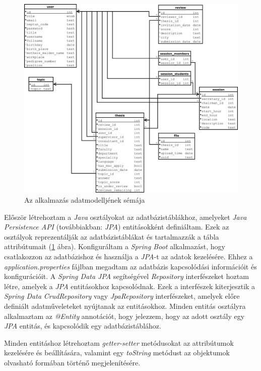 \begin{figure}[ht]
	\includegraphics[width=\textwidth]{images/Adatmodell.pdf}
	\caption{Az alkalmazás adatmodelljének sémája}
	\label{fig:datamodel}
\end{figure}


Először létrehoztam a \textit{Java} \cite{java} osztályokat az adatbázistáblákhoz, amelyeket \textit{Java Persistence API} (továbbiakban: \textit{JPA}) \cite{Java Persistence API} entitásokként definiáltam. Ezek az osztályok reprezentálják az adatbázistáblákat és tartalmazzák a tábla attribútumait (\ref{fig:datamodel} ábra). Konfiguráltam a \textit{Spring Boot} \cite{spring_boot} alkalmazást, hogy csatlakozzon az adatbázishoz és használja a \textit{JPA}-t \cite{Java Persistence API} az adatok kezelésére. Ehhez a \textit{application.properties} fájlban megadtam az adatbázis kapcsolódási információit és konfigurációit. A \textit{Spring Data JPA} \cite{Spring Data JPA} segítségével \textit{Repository} interfészeket hoztam létre, amelyek a \textit{JPA} entitásokhoz kapcsolódnak. Ezek a interfészek kiterjesztik a \textit{Spring Data} \textit{CrudRepository} vagy \textit{JpaRepository} interfészeket, amelyek előre definiált adatműveleteket nyújtanak az entitásokhoz. Minden entitás osztályra alkalmaztam az \textit{@Entity} annotációt, hogy jelezzem, hogy az adott osztály egy \textit{JPA} entitás, és kapcsolódik egy adatbázistáblához.


Minden entitáshoz létrehoztam \textit{getter-setter} metódusokat az attribútumok kezelésére és beállítására, valamint egy \textit{toString} metódust az objektumok olvasható formában történő megjelenítésére.

